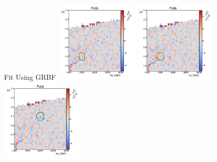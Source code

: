 \documentclass[10pt]{beamer}
\begin{document}
\begin{frame}{Fit Using GRBF}
  \makegrid%
  {}%
  {\includegraphics[width=0.3\textwidth]{figures/2dpullplots/grbf/E_1500_0p5_100_0p05.pdf}}%
  {\includegraphics[width=0.3\textwidth]{figures/2dpullplots/grbf/E_1500_0p5_150_0p05.pdf}}%
  { }%
  {\includegraphics[width=0.3\textwidth]{figures/2dpullplots/grbf/E_2000_0p7_150_0p05.pdf}}%

\end{frame}
\end{document}
